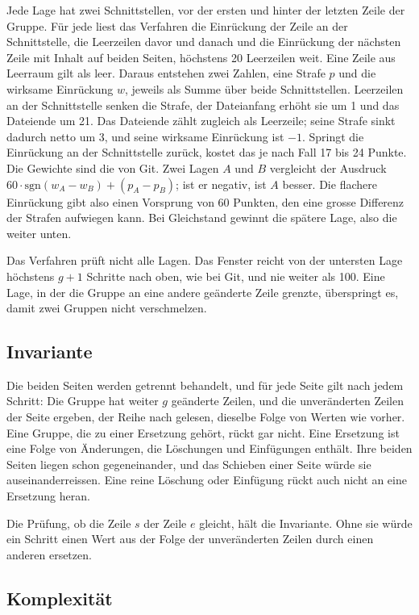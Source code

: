 Jede Lage hat zwei Schnittstellen, vor der ersten und hinter der letzten Zeile der Gruppe.
Für jede liest das Verfahren die Einrückung der Zeile an der Schnittstelle, die Leerzeilen davor
und danach und die Einrückung der nächsten Zeile mit Inhalt auf beiden Seiten, höchstens 20
Leerzeilen weit. Eine Zeile aus Leerraum gilt als leer. Daraus entstehen zwei Zahlen, eine
Strafe $p$ und die wirksame Einrückung $w$, jeweils als Summe über beide Schnittstellen.
Leerzeilen an der Schnittstelle senken die Strafe, der Dateianfang erhöht sie um 1 und das
Dateiende um 21. Das Dateiende zählt zugleich als Leerzeile; seine Strafe sinkt dadurch netto
um 3, und seine wirksame Einrückung ist $-1$.
Springt die Einrückung an der Schnittstelle zurück, kostet das je nach Fall 17 bis 24 Punkte.
Die Gewichte sind die von Git. Zwei Lagen $A$ und $B$ vergleicht der Ausdruck
$60 \cdot \mathrm{sgn}(w_A - w_B) + (p_A - p_B)$; ist er negativ, ist $A$ besser. Die flachere
Einrückung gibt also einen Vorsprung von 60 Punkten, den eine grosse Differenz der Strafen
aufwiegen kann. Bei Gleichstand gewinnt die spätere Lage, also die weiter unten.

Das Verfahren prüft nicht alle Lagen. Das Fenster reicht von der untersten Lage höchstens $g+1$
Schritte nach oben, wie bei Git, und nie weiter als 100. Eine Lage, in der die Gruppe an eine
andere geänderte Zeile grenzte, überspringt es, damit zwei Gruppen nicht verschmelzen.

\subsection{Invariante}

Die beiden Seiten werden getrennt behandelt, und für jede Seite gilt nach jedem Schritt:
Die Gruppe hat weiter $g$ geänderte Zeilen, und die unveränderten Zeilen der Seite ergeben, der
Reihe nach gelesen, dieselbe Folge von Werten wie vorher. Eine Gruppe, die zu einer Ersetzung
gehört, rückt gar nicht. Eine Ersetzung ist eine Folge von Änderungen, die Löschungen und
Einfügungen enthält. Ihre beiden Seiten liegen schon gegeneinander, und das Schieben einer Seite
würde sie auseinanderreissen. Eine reine Löschung oder Einfügung rückt auch nicht an eine
Ersetzung heran.

Die Prüfung, ob die Zeile $s$ der Zeile $e$ gleicht, hält die Invariante. Ohne sie würde ein
Schritt einen Wert aus der Folge der unveränderten Zeilen durch einen anderen ersetzen.

\subsection{Komplexität}

